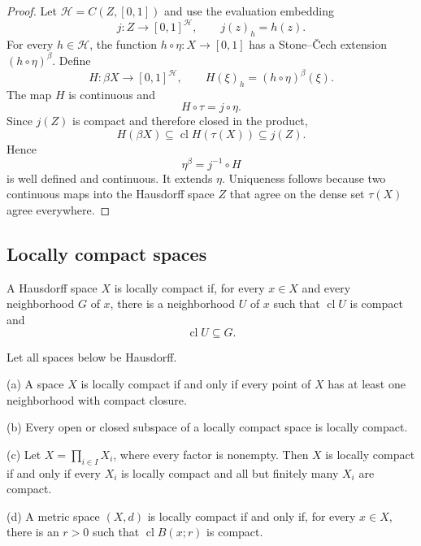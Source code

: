 \begin{proof}
Let $\mathcal{H}=C(Z,[0,1])$ and use the evaluation embedding
\[
j:Z\longrightarrow[0,1]^{\mathcal{H}},
\qquad
j(z)_h=h(z).
\]
For every $h\in\mathcal{H}$, the function $h\circ\eta:X\to[0,1]$ has a
Stone--\v{C}ech extension $(h\circ\eta)^\beta$. Define
\[
H:\beta X\longrightarrow[0,1]^{\mathcal{H}},
\qquad
H(\xi)_h=(h\circ\eta)^\beta(\xi).
\]
The map $H$ is continuous and
\[
H\circ\tau=j\circ\eta.
\]
Since $j(Z)$ is compact and therefore closed in the product,
\[
H(\beta X)
\subseteq\operatorname{cl}H(\tau(X))
\subseteq j(Z).
\]
Hence
\[
\eta^\beta=j^{-1}\circ H
\]
is well defined and continuous. It extends $\eta$. Uniqueness follows because
two continuous maps into the Hausdorff space $Z$ that agree on the dense set
$\tau(X)$ agree everywhere.
\end{proof}

\subsection{Locally compact spaces}

\begin{de}
A Hausdorff space $X$ is locally compact if, for every $x\in X$ and every
neighborhood $G$ of $x$, there is a neighborhood $U$ of $x$ such that
$\operatorname{cl}U$ is compact and
\[
\operatorname{cl}U\subseteq G.
\]
\end{de}

\begin{thm}
Let all spaces below be Hausdorff.

(a) A space $X$ is locally compact if and only if every point of $X$ has at
least one neighborhood with compact closure.

(b) Every open or closed subspace of a locally compact space is locally
compact.

(c) Let $X=\prod_{i\in I}X_i$, where every factor is nonempty. Then $X$ is
locally compact if and only if every $X_i$ is locally compact and all but
finitely many $X_i$ are compact.

(d) A metric space $(X,d)$ is locally compact if and only if, for every
$x\in X$, there is an $r>0$ such that $\operatorname{cl}B(x;r)$ is compact.
\end{thm}

